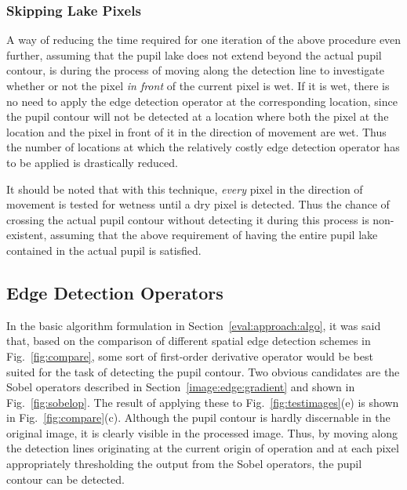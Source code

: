 
\subsubsection{Skipping Lake Pixels}

A way of reducing the time required for one iteration of the above
procedure even further, assuming that the pupil lake does not extend
beyond the actual pupil contour, is during the process of moving along
the detection line to investigate whether or not the pixel {\em in
  front\/} of the current pixel is wet.  If it is wet, there is no
need to apply the edge detection operator at the corresponding
location, since the pupil contour will not be detected at a location
where both the pixel at the location and the pixel in front of it in
the direction of movement are wet.  Thus the number of locations at
which the relatively costly edge detection operator has to be applied
is drastically reduced.

It should be noted that with this technique, {\em every\/} pixel in
the direction of movement is tested for wetness until a dry pixel is
detected.  Thus the chance of crossing the actual pupil contour
without detecting it during this process is non-existent, assuming
that the above requirement of having the entire pupil lake contained
in the actual pupil is satisfied.

\subsection{Edge Detection Operators}
\label{algo:pos:operators}

In the basic algorithm formulation in
Section~\ref{eval:approach:algo}, it was said that, based on the
comparison of different spatial edge detection schemes in
Fig.~\ref{fig:compare}, some sort of first-order derivative operator
would be best suited for the task of detecting the pupil contour.  Two
obvious candidates are the Sobel operators described in
Section~\ref{image:edge:gradient} and shown in Fig.~\ref{fig:sobelop}.
The result of applying these to Fig.~\ref{fig:testimages}(e) is shown
in Fig.~\ref{fig:compare}(c).  Although the pupil contour is hardly
discernable in the original image, it is clearly visible in the
processed image.  Thus, by moving along the detection lines
originating at the current origin of operation and at each pixel
appropriately thresholding the output from the Sobel operators, the
pupil contour can be detected.

